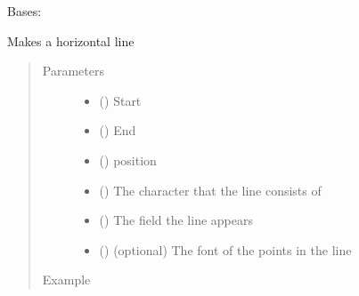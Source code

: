\documentclass[letterpaper,10pt,english]{sphinxmanual}
\begin{document}
\begin{fulllineitems}
\label{\detokenize{pypoints:pypoints.HLine}}
Bases: 

Makes a horizontal line
\begin{quote}\begin{description}
\item[{Parameters}] \leavevmode\begin{itemize}
\item {} 
 () \textendash{} Start 

\item {} 
 () \textendash{} End 

\item {} 
 () \textendash{}  position

\item {} 
 () \textendash{} The character that the line consists of

\item {} 
 () \textendash{} The field the line appears

\item {} 
 ({\hyperref[\detokenize{pypoints:pypoints.Font}]{}}) \textendash{} (optional) The font of the points in the line

\end{itemize}

\item[{Example}] \leavevmode
\end{description}\end{quote}

\begin{sphinxVerbatim}[commandchars=\\\{\}]
    
\end{sphinxVerbatim}



\end{fulllineitems}
\end{document}
